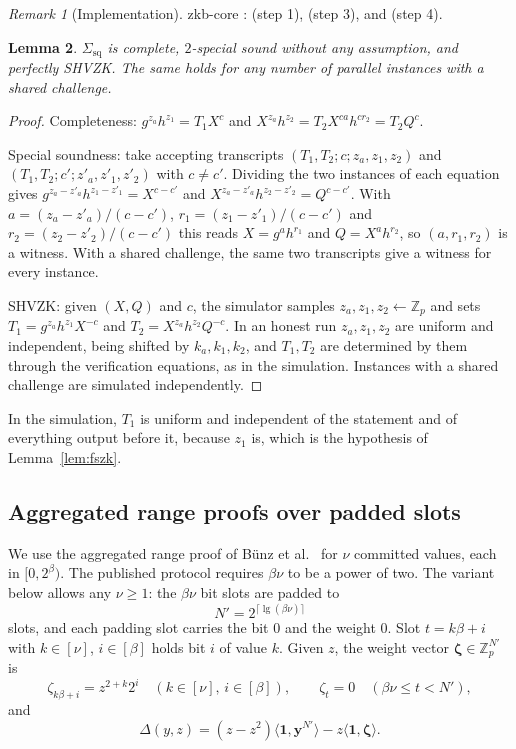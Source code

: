 \documentclass[11pt]{article}
\newtheorem{lemma}{Lemma}[section]
\theoremstyle{definition}
\theoremstyle{remark}
\newtheorem{remark}[lemma]{Remark}
\newcommand{\Z}{\mathbb{Z}}
\newcommand{\Sq}{\Sigma_{\mathrm{sq}}}
\newcommand{\bv}{\mathbf}
\newcommand{\one}{\mathbf 1}
\begin{document}
\begin{remark}[Implementation]\label{rem:impl-square}
zkb-core :  (step 1),  (step 3),  and  (step 4).
\end{remark}

\begin{lemma}\label{lem:square}
$\Sq$ is complete, $2$-special sound without any assumption, and perfectly SHVZK. The same holds for any number of parallel instances with a shared challenge.
\end{lemma}
\begin{proof}
Completeness: $g^{z_a}h^{z_1}=T_1X^c$ and $X^{z_a}h^{z_2}=T_2X^{ca}h^{cr_2}=T_2Q^c$.

Special soundness: take accepting transcripts $(T_1,T_2;c;z_a,z_1,z_2)$ and $(T_1,T_2;c';z'_a,z'_1,z'_2)$ with $c\ne c'$. Dividing the two instances of each equation gives $g^{z_a-z'_a}h^{z_1-z'_1}=X^{c-c'}$ and $X^{z_a-z'_a}h^{z_2-z'_2}=Q^{c-c'}$. With $a=(z_a-z'_a)/(c-c')$, $r_1=(z_1-z'_1)/(c-c')$ and $r_2=(z_2-z'_2)/(c-c')$ this reads $X=g^ah^{r_1}$ and $Q=X^ah^{r_2}$, so $(a,r_1,r_2)$ is a witness. With a shared challenge, the same two transcripts give a witness for every instance.

SHVZK: given $(X,Q)$ and $c$, the simulator samples $z_a,z_1,z_2\gets\Z_p$ and sets $T_1=g^{z_a}h^{z_1}X^{-c}$ and $T_2=X^{z_a}h^{z_2}Q^{-c}$. In an honest run $z_a,z_1,z_2$ are uniform and independent, being shifted by $k_a,k_1,k_2$, and $T_1,T_2$ are determined by them through the verification equations, as in the simulation. Instances with a shared challenge are simulated independently.
\end{proof}

In the simulation, $T_1$ is uniform and independent of the statement and of everything output before it, because $z_1$ is, which is the hypothesis of Lemma~\ref{lem:fszk}.

\subsection{Aggregated range proofs over padded slots}\label{sec:rp}
We use the aggregated range proof of Bünz et al.~\cite[Section~4.3]{bulletproofs} for $\nu$ committed values, each in $[0,2^\beta)$. The published protocol requires $\beta\nu$ to be a power of two. The variant below allows any $\nu\ge1$: the $\beta\nu$ bit slots are padded to
\[
  N'=2^{\lceil\lg(\beta\nu)\rceil}
\]
slots, and each padding slot carries the bit $0$ and the weight $0$. Slot $t=k\beta+i$ with $k\in[\nu]$, $i\in[\beta]$ holds bit $i$ of value $k$. Given $z$, the weight vector $\boldsymbol\zeta\in\Z_p^{N'}$ is
\[
  \zeta_{k\beta+i}=z^{2+k}2^i\quad(k\in[\nu],\,i\in[\beta]),\qquad\zeta_t=0\quad(\beta\nu\le t<N'),
\]
and
\[
  \Delta(y,z)=(z-z^2)\langle\one,\bv y^{N'}\rangle-z\langle\one,\boldsymbol\zeta\rangle.
\]
\end{document}

